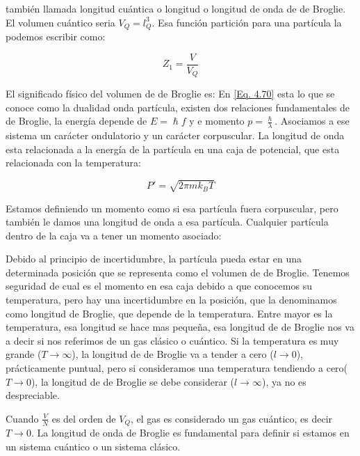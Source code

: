 \documentclass[11pt,fleqn]{book}
\begin{document}
también llamada longitud cuántica o longitud o longitud de onda de de Broglie. El volumen cuántico seria $V_{Q}=l_{Q}^{3}$. Esa función partición para una partícula la podemos escribir como:

\begin{equation}
    Z_{1}=\frac{V}{V_{Q}}
    \label{Eq. 4.71}
\end{equation}

El significado físico del volumen de de Broglie es: En \ref{Eq. 4.70} esta lo que se conoce como la dualidad onda partícula, existen dos relaciones fundamentales de de Broglie, la energía depende de $E=\hslash f$ y e momento $p=\frac{\hslash}{\lambda}$. Asociamos a ese sistema un carácter ondulatorio y un carácter corpuscular. La longitud de onda esta relacionada a la energía de la partícula en una caja de potencial, que esta relacionada con la temperatura:

\begin{equation}
        P'=\sqrt{2\pi mk_{B}T}
    \label{Eq. 4.72}
\end{equation}

Estamos definiendo un momento como si esa partícula fuera corpuscular, pero también le damos una longitud de onda a esa partícula. Cualquier partícula dentro de la caja va a tener un momento asociado:


Debido al principio de incertidumbre, la partícula pueda estar en una determinada posición que se representa como el volumen de de Broglie. Tenemos seguridad de cual es el momento en esa caja debido a que conocemos su temperatura, pero hay una incertidumbre en la posición, que la denominamos como longitud de Broglie, que depende de la temperatura. Entre mayor es la temperatura, esa longitud se hace mas pequeña, esa longitud de de Broglie nos va a decir si nos referimos de un gas clásico o cuántico. Si la temperatura es muy grande ($T\longrightarrow\infty$), la longitud de de Broglie va a tender a cero ($l\longrightarrow0$), prácticamente puntual, pero si consideramos una temperatura tendiendo a cero($T\longrightarrow0$), la longitud de de Broglie se debe considerar ($l\longrightarrow\infty$), ya no es despreciable. 



Cuando $\frac{V}{N}$ es del orden de $V_{Q}$, el gas es considerado un gas cuántico, es decir $T\longrightarrow0$. La longitud de onda de Broglie es fundamental para definir si estamos en un sistema cuántico o un sistema clásico.
\end{document}

